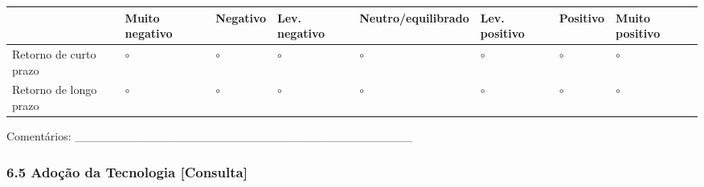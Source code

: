 {
\begin{longtable}[]{@{}
  >{\raggedright\arraybackslash}p{}
  >{\centering\arraybackslash}p{}
  >{\centering\arraybackslash}p{}
  >{\centering\arraybackslash}p{}
  >{\centering\arraybackslash}p{}
  >{\centering\arraybackslash}p{}
  >{\centering\arraybackslash}p{}
  >{\centering\arraybackslash}p{}@{}}
\toprule\noalign{}
\begin{minipage}[b]{\linewidth}\raggedright
\end{minipage} & \begin{minipage}[b]{\linewidth}\centering
Muito negativo
\end{minipage} & \begin{minipage}[b]{\linewidth}\centering
Negativo
\end{minipage} & \begin{minipage}[b]{\linewidth}\centering
Lev. negativo
\end{minipage} & \begin{minipage}[b]{\linewidth}\centering
Neutro/equilibrado
\end{minipage} & \begin{minipage}[b]{\linewidth}\centering
Lev. positivo
\end{minipage} & \begin{minipage}[b]{\linewidth}\centering
Positivo
\end{minipage} & \begin{minipage}[b]{\linewidth}\centering
Muito positivo
\end{minipage} \\
\midrule\noalign{}
\endhead
\bottomrule\noalign{}
\endlastfoot
Retorno de curto prazo & $\circ$ & $\circ$ & $\circ$ & $\circ$ & $\circ$ & $\circ$ & $\circ$ \\
Retorno de longo prazo & $\circ$ & $\circ$ & $\circ$ & $\circ$ & $\circ$ & $\circ$ & $\circ$ \\
\end{longtable}
}

Comentários: \_\_\_\_\_\_\_\_\_\_\_\_\_\_\_\_\_\_\_\_\_\_\_\_\_\_\_\_\_\_\_\_\_\_\_\_\_\_\_\_

\subsubsection{6.5 Adoção da Tecnologia {[Consulta]}}\label{adouxe7uxe3o-da-tecnologia}

